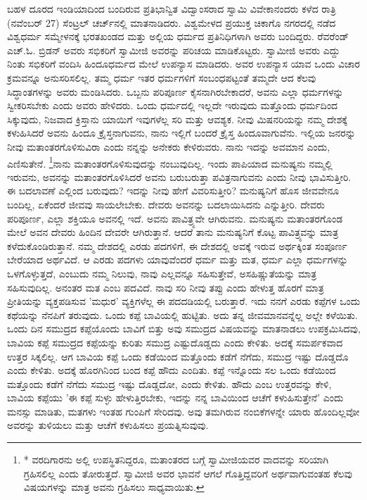 ಬಹಳ ದೂರದ ಇಂಡಿಯಾದಿಂದ ಬಂದಿರುವ ಪ್ರತಿಭಾನ್ವಿತ ವಿದ್ವಾಂಸರಾದ ಸ್ವಾಮಿ ವಿವೇಕಾನಂದರು ಕಳೆದ ರಾತ್ರಿ (ನವೆಂಬರ್ 27) ಸೆಂಟ್ರಲ್ ಚರ್ಚ್‌ನಲ್ಲಿ ಮಾತನಾಡಿದರು. ವಿಶ್ವಮೇಳದ ಪ್ರಯುಕ್ತ ಚಿಕಾಗೊ ನಗರದಲ್ಲಿ ನಡೆದ ವಿಶ್ವಧರ್ಮ ಸಮ್ಮೇಳನಕ್ಕೆ ಭರತಖಂಡದ ಮತ್ತು ಅಲ್ಲಿಯ ಧರ್ಮದ ಪ್ರತಿನಿಧಿಗಳಾಗಿ ಅವರು ಬಂದಿದ್ದರು. ರೆವರೆಂಡ್ ಎಚ್.ಓ. ಬ್ರಿಡನ್ ಅವರು ಸಭಿಕರಿಗೆ ಸ್ವಾಮೀಜಿ ಅವರನ್ನು ಪರಿಚಯ ಮಾಡಿಕೊಟ್ಟರು. ಸ್ವಾಮೀಜಿ ಅವರು ಎದ್ದು ನಿಂತು ಸಭಿಕರಿಗೆ ವಂದಿಸಿ ಹಿಂದೂಧರ್ಮದ ಮೇಲೆ ಉಪನ್ಯಾಸ ಮಾಡಿದರು. ಅವರ ಉಪನ್ಯಾಸ ಯಾವ ಒಂದು ವಿಚಾರ ಕ್ರಮವನ್ನೂ ಅನುಸರಿಸಲಿಲ್ಲ. ತಮ್ಮ ಧರ್ಮ ಇತರ ಧರ್ಮಗಳಿಗೆ ಸಂಬಂಧಪಟ್ಟಂತೆ ತಮ್ಮದೇ ಆದ ಕೆಲವು ಸಿದ್ಧಾಂತಗಳನ್ನು ಅವರು ಮಂಡಿಸಿದರು. ಒಬ್ಬನು ಪರಿಪೂರ್ಣ ಕೈಸನಾಗಿರಬೇಕಾದರೆ, ಅವನು ಎಲ್ಲಾ ಧರ್ಮಗಳನ್ನು ಸ್ವೀಕರಿಸಬೇಕು ಎಂದು ಅವರು ಹೇಳಿದರು. ಒಂದು ಧರ್ಮದಲ್ಲಿ ಇಲ್ಲದೇ ಇರುವುದು ಮತ್ತೊಂದು ಧರ್ಮದಿಂದ ಸಿಕ್ಕುವುದು, ನಿಜವಾದ ಕ್ರಿಸ್ತಾನು ಯಾಯಿಗೆ ಇವುಗಳೆಲ್ಲ ಸರಿ ಮತ್ತು ಆವಶ್ಯಕ. ನೀವು ಮಿಷನರಿಯನ್ನು ನಮ್ಮ ದೇಶಕ್ಕೆ ಕಳುಹಿಸಿದರೆ ಅವನು ಹಿಂದೂ ಕ್ರೈಸ್ತನಾಗುವನು, ನಾನು ಇಲ್ಲಿಗೆ ಬಂದರೆ ಕ್ರೈಸ್ತ ಹಿಂದೂವಾಗುವೆನು. ಇಲ್ಲಿಯ ಜನರನ್ನು ನೀವು ಮತಾಂತರಗೊಳಿಸುವಿರಾ ಎಂದು ನನ್ನನ್ನು ಅನೇಕರು ಕೇಳಿರುವರು. ನಾನು ಇದನ್ನು ಅವಮಾನ ಎಂದು, ಎಣಿಸುತೇನೆ. \footnote{* ವರದಿಗಾರನು ಅಲ್ಲಿ ಉಪಸ್ಥಿತನಿದ್ದರೂ, ಮತಾಂತರದ ಬಗ್ಗೆ ಸ್ವಾಮೀಜಿಯವರ ವಾದವನ್ನು ಸರಿಯಾಗಿ ಗ್ರಹಿಸಲಿಲ್ಲ ಎಂದು ತೋರುತ್ತದೆ. ಸ್ವಾಮೀಜಿ ಅವರ ಭಾವನೆ ಆಗಲೆ ಗೊತ್ತಿದ್ದವರಿಗೆ ಅರ್ಥವಾಗುವಂತಹ ಕೆಲವು ವಿಷಯಗಳನ್ನು ಮಾತ್ರ ಅವನು ಗ್ರಹಿಸಲು ಸಾಧ್ಯವಾಯಿತು.}ನಾನು ಮತಾಂತರಗೊಳಿಸುವುದನ್ನು ನಂಬುವುದಿಲ್ಲ. ಇಂದು ಪಾಪಿಯಾದ ಮನುಷ್ಯನು ನಮ್ಮಲ್ಲಿ ಇರುವನು, ಅವನನ್ನು ಮತಾಂತರಗೊಳಿಸಿದರೆ ಅವನು ಬರುಬರುತ್ತಾ ಪವಿತ್ರನಾಗುವನು ಎಂದು ನೀವು ಭಾವಿಸು\break ತ್ತೀರಿ. ಈ ಬದಲಾವಣೆ ಎಲ್ಲಿಂದ ಬರುವುದು? ಇದನ್ನು ನೀವು ಹೇಗೆ ವಿವರಿಸುತ್ತೀರಿ? ಮನುಷ್ಯನಿಗೆ ಹೊಸ ಜೀವವೇನೂ ಬಂದಿಲ್ಲ, ಏಕೆಂದರೆ ಜೀವವು ಸಾಯಲೇಬೇಕು. ದೇವರು ಅವನನ್ನು ಬದಲಾಯಿಸಿದನು ಎನ್ನುತ್ತೀರಿ. ದೇವರು ಪರಿಪೂರ್ಣ, ಎಲ್ಲಾ ಶಕ್ತಿಯೂ ಅವನಲ್ಲಿ ಇದೆ. ಅವನು ಪಾವಿತ್ರ್ಯವೇ ಆಗಿರುವನು. ಮನುಷ್ಯನು ಮತಾಂತರ\break ಗೊಂಡ ಮೇಲೆ ಅವನ ದೇವರು ಹಿಂದಿನ ದೇವರೇ ಆಗಿರುತ್ತಾನೆ. ಆದರೆ ತಾನು ಮನುಷ್ಯನಿಗೆ ಕೊಟ್ಟ ಪಾವಿತ್ರ್ಯವನ್ನು ಮಾತ್ರ ಕಳೆದುಕೊಂಡಿರುತ್ತಾನೆ. ನಮ್ಮ ದೇಶದಲ್ಲಿ ಎರಡು ಪದಗಳಿಗೆ, ಈ ದೇಶದಲ್ಲಿ ಅವಕ್ಕೆ ಇರುವ ಅರ್ಥಕ್ಕಿಂತ ಸಂಪೂರ್ಣ ಬೇರೆಯಾದ ಅರ್ಥವಿದೆ. ಆ ಎರಡು ಪದಗಳು ಯಾವುವೆಂದರೆ ಧರ್ಮ ಮತ್ತು ಮತ, ಧರ್ಮ ಎಲ್ಲಾ ಧರ್ಮಗಳನ್ನು ಒಳಗೊಳ್ಳುತ್ತದೆ, ಎಂಬುದು ನಮ್ಮ ನಿಲುವು, ನಾವು ಎಲ್ಲವನ್ನೂ ಸಹಿಸುತ್ತೇವೆ, ಅಸಹಿಷ್ಣುತೆಯನ್ನು ಮಾತ್ರ ಸಹಿಸುವುದಿಲ್ಲ. ಅನಂತರ ಮತ ಎಂಬ ಪದವಿದೆ. ನಾವು ಸರಿ ನೀವು ತಪ್ಪು ಎಂದು ಹೇಳುತ್ತ ಹೊರಗೆ ಮಾತ್ರ ಪ್ರೀತಿಯನ್ನು ವ್ಯಕ್ತಪಡಿಸುವ 'ಮಧುರ' ವ್ಯಕ್ತಿಗಳೆಲ್ಲ ಈ ಪದದಡಿಯಲ್ಲಿ ಬರುತ್ತಾರೆ. ಇದು ನನಗೆ ಎರಡು ಕಪ್ಪೆಗಳ ಒಂದು ಕಥೆಯನ್ನು ನೆನಪಿಗೆ ತರುವುದು. ಒಂದು ಕಪ್ಪೆ ಬಾವಿಯಲ್ಲಿ ಹುಟ್ಟಿತು. ಅದು ತನ್ನ ಜೀವಮಾನವನ್ನೆಲ್ಲ ಅಲ್ಲೇ ಕಳೆಯಿತು. ಒಂದು ದಿನ ಸಮುದ್ರದ ಕಪ್ಪೆಯೊಂದು ಬಾವಿಗೆ ಬಿತ್ತು ಅವು ಸಮುದ್ರದ ವಿಷಯವನ್ನು ಮಾತನಾಡಲು ಉಪಕ್ರಮಿಸಿದವು, ಬಾವಿಯ ಕಪ್ಪೆ ಸಮುದ್ರದ ಕಪ್ಪೆಯನ್ನು ಕುರಿತು ಸಮುದ್ರ ಎಷ್ಟುದೊಡ್ಡದು ಎಂದು ಕೇಳಿತು. ಅದಕ್ಕೆ ಸಮರ್ಪಕವಾದ ಉತ್ತರ ಸಿಕ್ಕಲಿಲ್ಲ. ಆಗ ಬಾವಿಯ ಕಪ್ಪೆ ಒಂದು ಕಡೆಯಿಂದ ಮತ್ತೊಂದು ಕಡೆಗೆ ನೆಗೆದು, ಸಮುದ್ರ ಇಷ್ಟು ದೊಡ್ಡದೊ ಎಂದು ಕೇಳಿತು. ಅದಕ್ಕೆ ಹೊರಗಿನಿಂದ ಬಂದ ಕಪ್ಪೆ ಹೌದು ಎಂದಿತು. ಕಪ್ಪೆ ಇನ್ನೊಂದು ಸಲ ಒಂದು ಕಡೆಯಿಂದ ಮತ್ತೊಂದು ಕಡೆಗೆ ನೆಗೆದು ಸಮುದ್ರ ಇಷ್ಟು ದೊಡ್ಡದೋ, ಎಂದು ಕೇಳಿತು. ಹೌದು ಎಂಬ ಉತ್ತರವನ್ನು ಕೇಳಿ, ಬಾವಿಯ ಕಪ್ಪೆಯು 'ಈ ಕಪ್ಪೆ ಸುಳ್ಳು ಹೇಳುತ್ತಿರಬೇಕು, ಇದನ್ನು ನನ್ನ ಬಾವಿಯಿಂದ ಆಚೆಗೆ ಕಳುಹಿಸುತ್ತೇನೆ' ಎಂದು ಮನಸ್ಸು ಮಾಡಿತು, ಮತಗಳು ಇಂತಹ ಗುಂಪಿಗೆ ಸೇರಿದವು. ಅವು ತಮಗಿರುವ ನಂಬಿಕೆಗಳನ್ನೇ ಯಾರು ಹೊಂದಿಲ್ಲವೋ ಅವರನ್ನು ತುಳಿಯಲು ಮತ್ತು ಆಚೆಗೆ ಕಳುಹಿಸಲು ಪ್ರಯತ್ನಿಸುವುವು.

